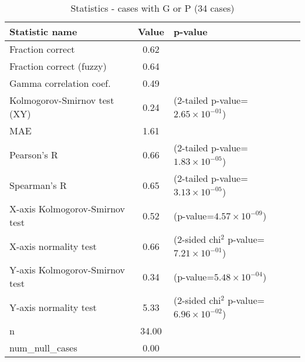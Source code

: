 \documentclass[10pt, letterpaper, oneside, titlepage, landscape]{scrreprt}
\begin{document}
\begin{table}[H]\begin{center}
\begin{tabular}{ l S[table-format=3.2] l}
Statistic name & {Value} & p-value\\
\hline
Fraction correct & 0.62 & \\
Fraction correct (fuzzy) & 0.64 & \\
Gamma correlation coef. & 0.49 & \\
Kolmogorov-Smirnov test (XY) & 0.24 & (2-tailed p-value=$2.65\times10^{-01}$)\\
MAE & 1.61 & \\
Pearson's R & 0.66 & (2-tailed p-value=$1.83\times10^{-05}$)\\
Spearman's R & 0.65 & (2-tailed p-value=$3.13\times10^{-05}$)\\
X-axis Kolmogorov-Smirnov test & 0.52 & (p-value=$4.57\times10^{-09}$)\\
X-axis normality test & 0.66 & (2-sided chi$^{2}$ p-value=$7.21\times10^{-01}$)\\
Y-axis Kolmogorov-Smirnov test & 0.34 & (p-value=$5.48\times10^{-04}$)\\
Y-axis normality test & 5.33 & (2-sided chi$^{2}$ p-value=$6.96\times10^{-02}$)\\
n & 34.00 & \\
num\_null\_cases & 0.00 & \\
\end{tabular}
\caption{Statistics - cases with G or P (34 cases)}
\end{center}\end{table}
\end{document}

